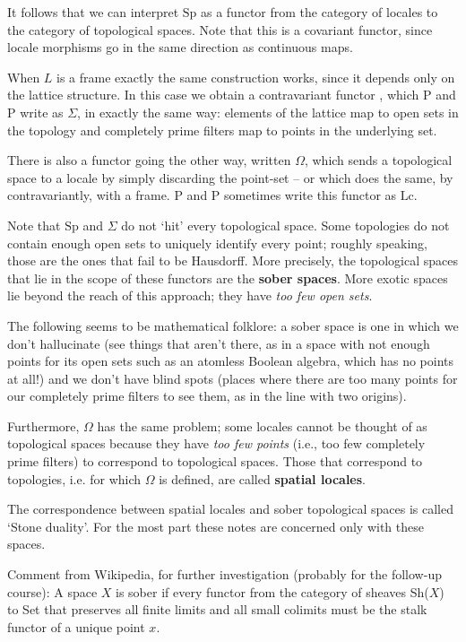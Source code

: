 \documentclass[oneside,english]{amsbook}
\numberwithin{section}{chapter}
\theoremstyle{plain}
\theoremstyle{definition}
\begin{document}
It follows that we can interpret $\text{Sp}$ as a functor from the category of locales to the category of topological spaces. Note that this is a covariant functor, since locale morphisms go in the same direction as continuous maps.

When $L$ is a frame exactly the same construction works, since it depends only on the lattice structure. In this case we obtain a contravariant functor , which P and P write as $\Sigma$, in exactly the same way: elements of the lattice map to open sets in the topology and completely prime filters map to points in the underlying set.

There is also a functor going the other way, written $\Omega$, which sends a topological space to a locale by simply discarding the point-set -- or which does the same, by contravariantly, with a frame. P and P sometimes write this functor as $\text{Lc}$.

Note that  $\text{Sp}$ and $\Sigma$ do not `hit' every topological space. Some topologies do not contain enough open sets to uniquely identify every point; roughly speaking, those are the ones that fail to be Hausdorff. More precisely, the topological spaces that lie in the scope of these functors are the \textbf{sober spaces}. More exotic spaces lie beyond the reach of this approach; they have \emph{too few open sets}.

The following seems to be mathematical folklore: a sober space is one in which we don't hallucinate (see things that aren't there, as in a space with not enough points for its open sets such as an atomless Boolean algebra, which has no points at all!) and we don't have blind spots (places where there are too many points for our completely prime filters to see them, as in the line with two origins).

Furthermore, $\Omega$ has the same problem; some locales cannot be thought of as topological spaces because they have \emph{too few points} (i.e., too few completely prime filters) to correspond to topological spaces. Those that correspond to topologies, i.e. for which $\Omega$ is defined, are called \textbf{spatial locales}.

The correspondence between spatial locales and sober topological spaces is called `Stone duality'. For the most part these notes are concerned only with these spaces.

Comment from Wikipedia, for further investigation (probably for the follow-up course): A space $X$ is sober if every functor from the category of sheaves Sh($X$) to Set that preserves all finite limits and all small colimits must be the stalk functor of a unique point $x$.
\end{document}
